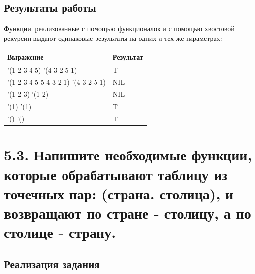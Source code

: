 \documentclass[a4paper,12pt]{article}
\begin{document}
 	\subsection*{Результаты работы}
 	
 	Функции, реализованные с помощью функционалов и с помощью хвостовой рекурсии выдают одинаковые результаты на одних и тех же параметрах:
 	
 	\begin{table} [h!]
 		\begin{center}
 			\begin{tabular}{|l|l|}
 				\hline
 				{\bf  Выражение} & {\bf Результат} \\
 				\hline
 				{'(1 2 3 4 5) '(4 3 2 5 1)} & T\\
 				\hline
 				{'(1 2 3 4 5 5 4 3 2 1) '(4 3 2 5 1)} & NIL\\
 				\hline
 				{'(1 2 3) '(1 2)} & NIL\\
 				\hline
 				{'(1) '(1)} & T\\
 				\hline
 				{'() '()} & T\\
 				\hline
 			\end{tabular}  
 			\label{m1}
 		\end{center}
 	\end{table}
 	
 	\newpage
 	
 	\section*{5.3. Напишите необходимые функции, которые обрабатывают таблицу из точечных пар:
(страна. столица), и возвращают по стране - столицу, а по столице - страну.
 	}
 	
 	\subsection*{Реализация задания}
 	
\end{document}
